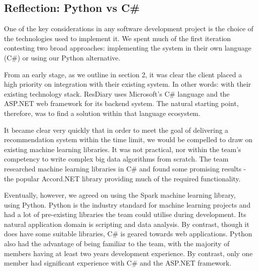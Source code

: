 \documentclass{l3proj}
\begin{document}
\subsection{Reflection: Python vs C\#}
\label{sec:pyreflection}



One of the key considerations in any software development project is the choice of the technologies used to implement it. We spent much of the first iteration contesting two broad approaches: implementing the system in their own language (C\#) or using our Python alternative.

From an early stage, as we outline in section 2, it was clear the client placed a high priority on integration with their existing system. In other words: with their existing technology stack. ResDiary uses Microsoft's C\# language and the ASP.NET web framework for its backend system. The natural starting point, therefore, was to find a solution within that language ecosystem. 

It became clear very quickly that in order to meet the goal of delivering a recommendation system within the time limit, we would be compelled to draw on existing machine learning libraries. It was not practical, nor within the team’s competency to write complex big data algorithms from scratch. The team researched machine learning libraries in C\# and found some promising results - the popular Accord.NET library providing much of the required functionality. 

Eventually, however, we agreed on using the Spark machine learning library, using Python. Python is the industry standard for machine learning projects and had a lot of pre-existing libraries the team could utilise during development. Its natural application domain is scripting and data analysis. By contrast, though it does have some suitable libraries, C\# is geared towards web applications. Python also had the advantage of being familiar to the team, with the majority of members having at least two years development experience. By contrast, only one member had significant experience with C\# and the ASP.NET framework.
\end{document}
